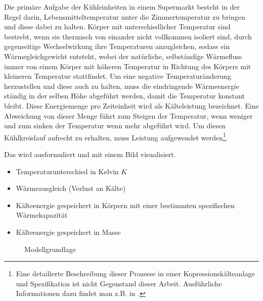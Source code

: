 Die primäre Aufgabe der Kühleinheiten in einem Supermarkt besteht in der Regel
darin, Lebensmitteltemperatur unter die Zimmertemperatur zu bringen und diese
dabei zu halten. Körper mit unterschiedlicher
Temperatur sind bestrebt, wenn sie thermisch von einander nicht vollkommen
isoliert sind, durch gegenseitige Wechselwirkung ihre Temperaturen anzugleichen,
sodass ein Wärmegleichgewicht entsteht, wobei der natürliche, selbständige
Wärmefluss immer von einem Körper mit höheren Temperatur in Richtung des Körpers
mit kleineren Temperatur stattfindet. Um eine negative Temperaturänderung
herzustellen und diese auch zu halten, muss die eindringende Wärmeenergie
ständig in der selben Höhe abgeführt werden, damit die Temperatur konstant
bleibt. Diese Energiemenge pro Zeiteinheit wird als Kälteleistung bezeichnet.
Eine Abweichung von dieser Menge führt zum Steigen der Temperatur, wenn weniger
und zum sinken der Temperatur wenn mehr abgeführt wird. Um diesen Kühlkreislauf
aufrecht zu erhalten, muss Leistung aufgewendet werden\footnote{ Eine
detailierte Beschreibung dieser Prozesse in einer Kopressionskälteanlage und
Spezifikation ist nicht Gegenstand dieser Arbeit.  Ausführliche Informationen
dazu findet man z.B.  in \cite{caro, doctor, TAB_A1}.}.

%


Das wird ausformuliert und mit einem Bild visualisiert.
\begin{itemize}
	\item Temperaturunterschied in Kelvin $K$
	\item Wärmeausgleich (Verlust an Kälte)
	\item Kälteenergie gespeichert in Körpern mit einer bestimmten
	spezifischen Wärmekapazität
	\item Kälteenergie gespeichert in Masse
\end{itemize}
\begin{figure}\caption{ Modellgrundlage}
\end{figure}


